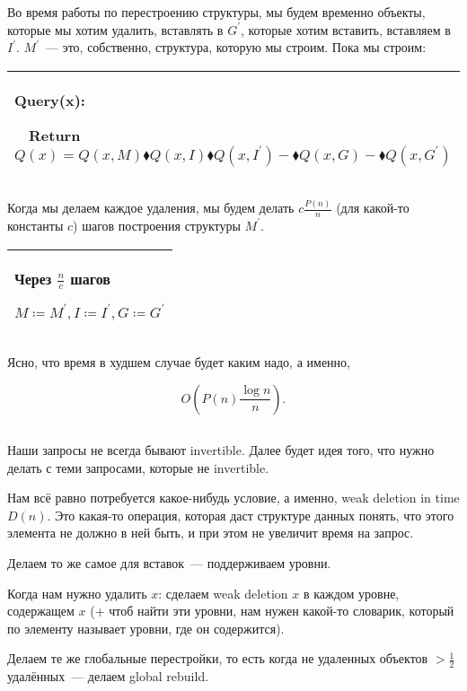 Во время работы по перестроению структуры, мы будем временно объекты, которые мы хотим удалить, вставлять в $G^\prime$, которые хотим вставить, вставляем в $I^\prime$. $M^\prime$~--- это, собственно, структура, которую мы строим. Пока мы строим:


\begin{tabular}{|p{11cm}|}
	\hline
	Query(x):

	$\quad$Return $Q(x) = Q(x,M)\blacklozenge Q(x,I) \blacklozenge Q(x,I^\prime) - \blacklozenge Q(x,G) - \blacklozenge Q(x,G^\prime)$ \\
	\hline
\end{tabular}


Когда мы делаем каждое удаления, мы будем делать $c\frac{P(n)}{n}$ (для какой-то константы $c$) шагов построения структуры $M^\prime$.


\begin{tabular}{|p{4cm}|}
	\hline
	Через $\frac{n}{c}$ шагов

	$M \coloneqq M^\prime,I \coloneqq I^\prime,G \coloneqq G^\prime$ \\
	\hline
\end{tabular}


Ясно, что время в худшем случае будет каким надо, а именно,

\begin{equation*}
	O\left(P(n)\frac{\log n}{n} \right).
\end{equation*}

\subsection{}

Наши запросы не всегда бывают invertible. Далее будет идея того, что нужно делать с теми запросами, которые не invertible.

Нам всё равно потребуется какое-нибудь условие, а именно, weak deletion in time $D(n)$. Это какая-то операция, которая даст структуре данных понять, что этого элемента не должно в ней быть, и при этом не увеличит время на запрос.

Делаем то же самое для вставок~--- поддерживаем уровни.

Когда нам нужно удалить $x$: сделаем weak deletion $x$ в каждом уровне, содержащем $x$ (+ чтоб найти эти уровни, нам нужен какой-то словарик, который по элементу называет уровни, где он содержится).

Делаем те же глобальные перестройки, то есть когда не удаленных объектов $ > \frac{1}{2}$ удалённых~--- делаем global rebuild.

